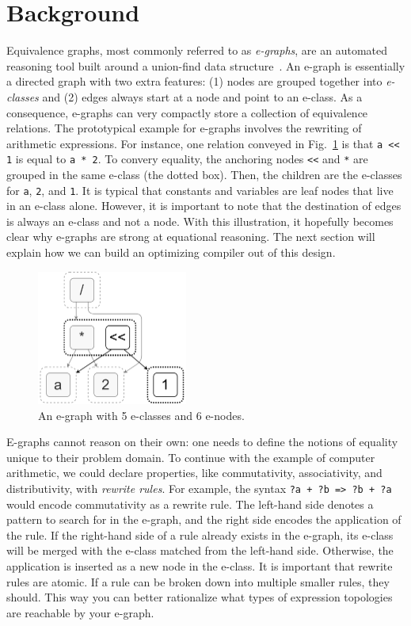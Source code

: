 \documentclass[10pt,letterpaper]{article}
\begin{document}
\section{Background}\label{sec:background}

Equivalence graphs, most commonly referred to as \textit{e-graphs}, are an
automated reasoning tool built around a union-find data
structure~\cite{eggpaper}. An e-graph is essentially a directed graph with two
extra features: (1) nodes are grouped together into \textit{e-classes} and (2)
edges always start at a node and point to an e-class. As a consequence,
e-graphs can very compactly store a collection of equivalence relations. The
prototypical example for e-graphs involves the rewriting of arithmetic
expressions. For instance, one relation conveyed in Fig.~\ref{fig:egraph} is
that \texttt{a << 1} is equal to \texttt{a * 2}. To convery equality, the
anchoring nodes \texttt{<<} and \texttt{*} are grouped in the same e-class (the
dotted box). Then, the children are the e-classes for \texttt{a}, \texttt{2},
and \texttt{1}. It is typical that constants and variables are leaf nodes that
live in an e-class alone. However, it is important to note that the destination
of edges is always an e-class and not a node. With this illustration, it
hopefully becomes clear why e-graphs are strong at equational reasoning. The
next section will explain how we can build an optimizing compiler out of this
design.

\begin{figure}
    \centering
    \includegraphics[width=0.44\textwidth]{img/egraph.png}
    \caption{An e-graph with 5 e-classes and 6 e-nodes.}\label{fig:egraph}
\end{figure}

E-graphs cannot reason on their own: one needs to define the notions of
equality unique to their problem domain. To continue with the example of
computer arithmetic, we could declare properties, like commutativity,
associativity, and distributivity, with \textit{rewrite rules}. For example,
the syntax \texttt{?a + ?b => ?b + ?a} would encode commutativity as a rewrite
rule. The left-hand side denotes a pattern to search for in the e-graph, and
the right side encodes the application of the rule. If the right-hand side of a
rule already exists in the e-graph, its e-class will be merged with the e-class
matched from the left-hand side. Otherwise, the application is inserted as a
new node in the e-class. It is important that rewrite rules are atomic. If a
rule can be broken down into multiple smaller rules, they should. This way you
can better rationalize what types of expression topologies are reachable by
your e-graph.
\end{document}
